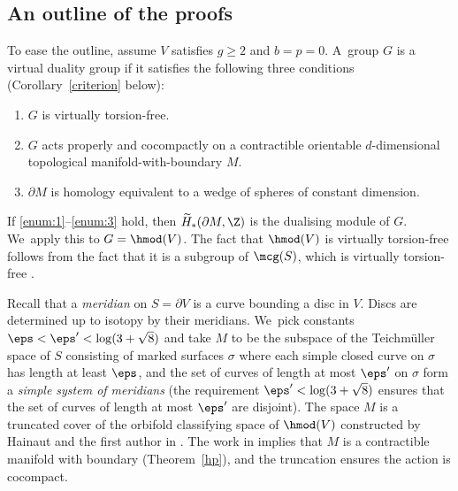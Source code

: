 \subsection{An outline of the proofs}

To ease the outline, assume $V$ satisfies $g\geq 2$ and $b=p=0$. A~group $G$ is a virtual duality group if it satisfies the following three conditions (Corollary~\ref{criterion} below):\enlargethispage{.5\baselineskip}
\begin{enumerate}
\item\label{enum:1} $G$ is virtually torsion-free.
\item\label{enum:2} $G$ acts properly and cocompactly on a contractible
orientable $d$-dimensional topological manifold-with-boundary $M$.
\item\label{enum:3} $\partial M$ is homology equivalent to a wedge of spheres of constant dimension.
\end{enumerate}
If \eqref{enum:1}--\eqref{enum:3} hold, then $\widetilde H_\ast(\partial M,\Z)$ is the dualising module of $G$. We~apply this to $G=\hmod(V)$. The fact that $\hmod(V)$ is virtually torsion-free follows from the fact that it is a subgroup of $\mcg(S)$, which is virtually torsion-free \cite[Th.\,6.9]{farbmargalit}.

Recall that a \emph{meridian} on $S=\partial V$ is a curve bounding a disc in $V$. Discs are determined up to isotopy by their meridians. We~pick constants $\eps < \eps ' < \log(3+\sqrt{8})$ and take $M$ to be the subspace of the Teichmüller space of $S$ consisting of marked surfaces $\sigma$ where each simple closed curve on $\sigma$ has length at least $\eps$, and the set of curves of length at most $\eps'$ on $\sigma$ form a \emph{simple system of meridians} (the requirement $\eps ' < \log(3+\sqrt{8})$ ensures that the set of curves of length at most $\eps'$ are disjoint). The space $M$ is a truncated cover of the orbifold classifying space of $\hmod(V)$ constructed by Hainaut and the first author in \cite{hainautpetersen}. The work in \cite{hainautpetersen} implies that $M$ is a contractible manifold with boundary (Theorem~\ref{hp}), and the truncation ensures the action is cocompact.

